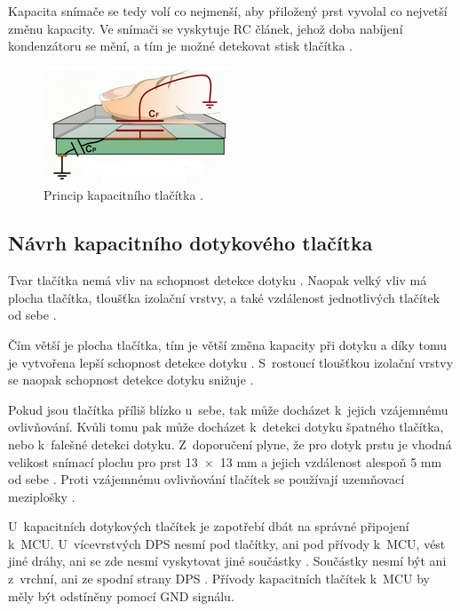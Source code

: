 Kapacita snímače se tedy volí co nejmenší, aby přiložený prst vyvolal co nejvetší změnu kapacity. Ve snímači se vyskytuje
RC článek, jehož doba nabíjení kondenzátoru se mění, a tím je možné detekovat stisk tlačítka \cite{PrincipKapTl}. 

\begin{figure}[!h]
  \begin{center}
    \includegraphics[scale=1]{obrazky/kapacitni_princip.png}
  \end{center}
  \caption[Princip kapacitního tlačítka]{Princip kapacitního tlačítka \cite{PrincipKapTl}.}
\end{figure}

\subsection{Návrh kapacitního dotykového tlačítka}
Tvar tlačítka nemá vliv na schopnost detekce dotyku \cite{PrincipKapTl}. Naopak velký vliv má plocha tlačítka, tloušťka
izolační vrstvy, a také vzdálenost jednotlivých tlačítek od sebe \cite{PrincipKapTl}. 

Čím větší je plocha tlačítka, tím je větší změna kapacity při dotyku a díky tomu je vytvořena lepší schopnost detekce 
dotyku \cite{PrincipKapTl}. S~rostoucí tloušťkou izolační vrstvy se naopak schopnost detekce dotyku snižuje \cite{PrincipKapTl}.

Pokud jsou tlačítka příliš blízko u~sebe, tak může docházet k~jejich vzájemnému ovlivňování. Kvůli tomu pak může docházet
k~detekci dotyku špatného tlačítka, nebo k~falešné detekci dotyku. Z~doporučení plyne, že pro dotyk prstu je vhodná velikost snímací 
plochu pro prst 13~$\times$~13 mm a jejich vzdálenost alespoň 5 mm od sebe \cite{PrincipKapTl}. Proti vzájemnému ovlivňování tlačítek
se používají uzemňovací meziplošky \cite{PrincipKapTl}. 

U~kapacitních dotykových tlačítek je zapotřebí dbát na správné připojení k~MCU. U~vícevrstvých DPS nesmí pod tlačítky, ani pod přívody
k~MCU, vést jiné dráhy, ani se zde nesmí vyskytovat jiné součástky \cite{PrincipKapTl}. Součástky nesmí být ani z~vrchní, ani ze spodní 
strany DPS \cite{PrincipKapTl}. Přívody kapacitních tlačítek k~MCU by měly být odstíněny pomocí GND signálu.

